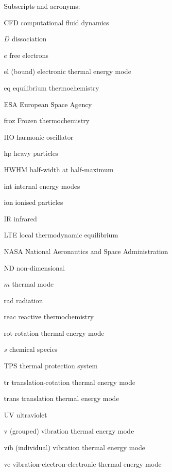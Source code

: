 \medskip

Subscripts and acronyms:

\par

\begin{list}{}{%
\setlength{\labelwidth}{24mm}
\setlength{\leftmargin}{35mm}}
 \item[CFD\dotfill] computational fluid dynamics
 \item[$D$\dotfill] dissociation
 \item[$e$\dotfill] free electrons
 \item[el\dotfill] (bound) electronic thermal energy mode
 \item[eq\dotfill] equilibrium thermochemistry
 \item[ESA\dotfill] European Space Agency
 \item[froz\dotfill] Frozen thermochemistry
 \item[HO\dotfill] harmonic oscillator
 \item[hp\dotfill] heavy particles
 \item[HWHM\dotfill] half-width at half-maximum
 \item[int\dotfill] internal energy modes
 \item[ion\dotfill] ionised particles
 \item[IR\dotfill] infrared
 \item[LTE\dotfill] local thermodynamic equilibrium
 \item[NASA\dotfill] National Aeronautics and Space Administration
 \item[ND\dotfill] non-dimensional
 \item[$m$\dotfill] thermal mode
 \item[rad\dotfill] radiation
 \item[reac\dotfill] reactive thermochemistry
 \item[rot\dotfill] rotation thermal energy mode
 \item[$s$\dotfill] chemical species
 \item[TPS\dotfill] thermal protection system
 \item[tr\dotfill] translation-rotation thermal energy mode
 \item[trans\dotfill] translation thermal energy mode
 \item[UV\dotfill] ultraviolet
 \item[v\dotfill] (grouped) vibration thermal energy mode
 \item[vib\dotfill] (individual) vibration thermal energy mode
 \item[ve\dotfill] vibration-electron-electronic thermal energy mode
\end{list}




